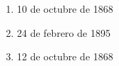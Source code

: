 \documentclass[twocolumn]{article}
\begin{document}
\begin{enumerate}
  \begin{enumerate}
   
   \item 10 de octubre de 1868
   
   \item 24 de febrero de 1895
   
   \item 12 de octubre de 1868
   
  \end{enumerate}


\end{enumerate}


\end{document}
